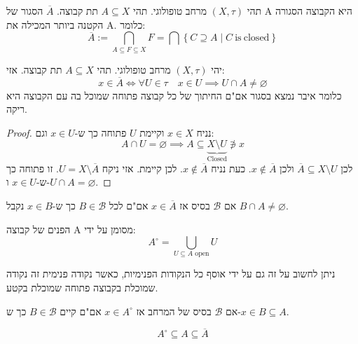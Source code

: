 \documentclass{tstextbook}
\begin{document}
\begin{definition}
תהי \((X,\tau)\) מרחב טופולוגי. תהי \(A\subseteq X\) תת קבוצה. \(\overline{A}\) הסגור של A היא הקבוצה הסגורה הקטנה ביותר המכילה את A. כלומר:
$$\overline{A} := \bigcap_{A\subseteq F\subseteq X} F=\bigcap\left\{ C\supseteq A\mid C{\mathrm{~is~closed}} \right\}$$

\end{definition}
\begin{proposition}
יהי \((X,\tau)\) מרחב טופולוגי. תהי \(A\subseteq X\) תת קבוצה. אזי:
$$x\in \overline{A} \iff \forall U \in \tau \quad x \in U \implies U\cap  A\neq \varnothing $$
כלומר איבר נמצא בסגור אם"ם החיתוך של כל קבוצה פתוחה שמוכל בה עם הקבוצה היא ריקה.

\end{proposition}
\begin{proof}
נניח \(x \in X\) וקיימת \(U\) פתוחה כך ש-\(x \in U\) וגם:
$$A\cap  U = \varnothing \implies A\subseteq \underbrace{ X \setminus  U }_{ \text{Closed} } \not\ni x$$
לכן \(\overline{A} \subseteq X \setminus U\) ולכן \(x \not\in \overline{ A}\).
כעת נניח \(x \not\in \overline{A}\). לכן קיימת. אזי ניקח \(U= X \setminus \overline{A}\). זו פתוחה כך ש-\(x \in U\) ו-\(U\cap A = \varnothing\).

\end{proof}
\begin{corollary}
אם \(\mathcal{ B}\) בסיס אז \(x \in \overline{A}\) אם"ם לכל \(B \in \mathcal{B}\) כך ש-\(x \in B\) נקבל \(B\cap A \neq \varnothing\).

\end{corollary}
\begin{definition}
הפנים של קבוצה A מסומן על ידי:
$$A^{\circ }=\bigcup_{U\subseteq A \text{ open}}U$$

\end{definition}
\begin{remark}
ניתן לחשוב על זה גם על ידי אוסף כל הנקודות הפנימיות, כאשר נקודה פנימית זה נקודה שמוכלת בקבוצה פתוחה שמוכלת בקטע.

\end{remark}
\begin{proposition}
אם \(\mathcal{B}\) בסיס של המרחב אז \(x \in A^{\circ}\) אם"ם קיים \(B \in \mathcal{B}\) כך ש-\(x \in B\subseteq A\).

\end{proposition}
\begin{proposition}
$$A^{\circ }\subseteq A\subseteq \overline{A} $$

\end{proposition}
\end{document}
